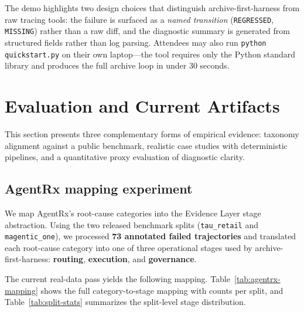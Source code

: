 \documentclass[11pt]{article}
\begin{document}
The demo highlights two design choices that distinguish archive-first-harness from raw tracing tools: the failure is surfaced as a \emph{named transition} (\texttt{REGRESSED}, \texttt{MISSING}) rather than a raw diff, and the diagnostic summary is generated from structured fields rather than log parsing. Attendees may also run \texttt{python quickstart.py} on their own laptop---the tool requires only the Python standard library and produces the full archive loop in under 30 seconds.

\section{Evaluation and Current Artifacts}
\label{sec:eval}

This section presents three complementary forms of empirical evidence: taxonomy alignment against a public benchmark, realistic case studies with deterministic pipelines, and a quantitative proxy evaluation of diagnostic clarity.

\subsection{AgentRx mapping experiment}

We map AgentRx's root-cause categories into the Evidence Layer stage abstraction. Using the two released benchmark splits (\texttt{tau\_retail} and \texttt{magentic\_one}), we processed \textbf{73 annotated failed trajectories} and translated each root-cause category into one of three operational stages used by archive-first-harness: \textbf{routing}, \textbf{execution}, and \textbf{governance}.

The current real-data pass yields the following mapping. Table~\ref{tab:agentrx-mapping} shows the full category-to-stage mapping with counts per split, and Table~\ref{tab:split-stats} summarizes the split-level stage distribution.
\end{document}
